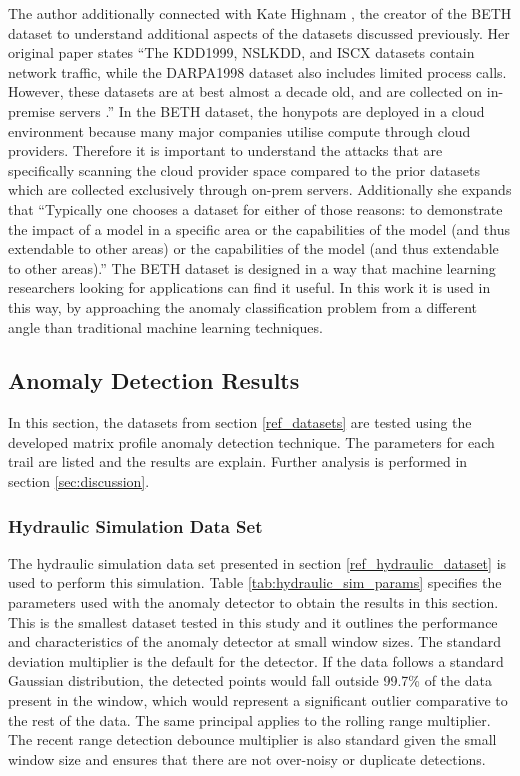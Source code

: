 The author additionally connected with Kate Highnam \cite{Highnam-email:private}, the creator of the BETH dataset to understand additional aspects of the datasets discussed previously. Her original paper states ``The KDD1999, NSLKDD, and ISCX datasets contain network traffic, while the DARPA1998 dataset also includes limited process calls. However, these datasets are at best almost a decade old, and are collected on in-premise servers \cite{beth-dataset}.'' In the BETH dataset, the honypots are deployed in a cloud environment because many major companies utilise compute through cloud providers. Therefore it is important to understand the attacks that are specifically scanning the cloud provider space compared to the prior datasets which are collected exclusively through on-prem servers. Additionally she expands that ``Typically one chooses a dataset for either of those reasons: to demonstrate the impact of a model in a specific area or the capabilities of the model (and thus extendable to other areas)  or the capabilities of the model (and thus extendable to other areas).'' The BETH dataset is designed in a way that machine learning researchers looking for applications can find it useful. In this work it is used in this way, by approaching the anomaly classification problem from a different angle than traditional machine learning techniques.

\subsection{Anomaly Detection Results}

In this section, the datasets from section \ref{ref_datasets} are tested using the developed matrix profile anomaly detection technique. The parameters for each trail are listed and the results are explain. Further analysis is performed in section \ref{sec:discussion}.

\subsubsection{Hydraulic Simulation Data Set}
\label{ref_results_hydraulic_sim}
The hydraulic simulation data set presented in section \ref{ref_hydraulic_dataset} is used to perform this simulation. Table \ref{tab:hydraulic_sim_params} specifies the parameters used with the anomaly detector to obtain the results in this section. This is the smallest dataset tested in this study and it outlines the performance and characteristics of the anomaly detector at small window sizes. The standard deviation multiplier is the default for the detector. If the data follows a standard Gaussian distribution, the detected points would fall outside 99.7\% of the data present in the window, which would represent a significant outlier comparative to the rest of the data. The same principal applies to the rolling range multiplier. The recent range detection debounce multiplier is also standard given the small window size and ensures that there are not over-noisy or duplicate detections.

